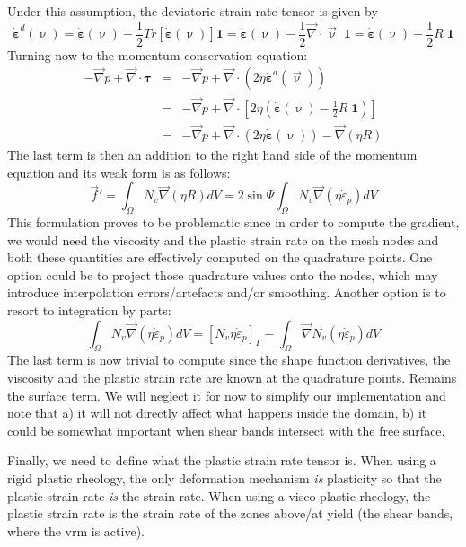 Under this assumption, the deviatoric strain rate tensor is given by
\[
\dot{\bm \varepsilon}^d(\upnu)
= \dot{\bm \varepsilon}(\upnu)- \frac{1}{2} Tr[\dot{\bm \varepsilon}(\upnu)] {\bm 1}
= \dot{\bm \varepsilon}(\upnu)- \frac{1}{2} \vec\nabla\cdot\vec\upnu \; {\bm 1}
= \dot{\bm \varepsilon}(\upnu)- \frac{1}{2} R \; {\bm 1}
\]
Turning now to the momentum conservation equation:
\begin{eqnarray}
-\vec\nabla p + \vec\nabla \cdot {\bm \tau} 
&=& -\vec\nabla p + \vec\nabla \cdot (2 \eta \dot{\bm \varepsilon}^d(\vec\upnu))  \\
&=& -\vec\nabla p + \vec\nabla \cdot \left[ 2 \eta \left(\dot{\bm \varepsilon}(\upnu)- \frac{1}{2} R \; {\bm 1}\right) \right] \\
&=& -\vec\nabla p 
+ \vec\nabla \cdot \left( 2 \eta \dot{\bm \varepsilon}(\upnu)\right) - \vec\nabla(\eta R) 
\end{eqnarray}
The last term is then an addition to the right hand side of the momentum equation 
and its weak form is as follows:
\[
\vec f' 
= \int_\Omega N_v \vec\nabla(\eta R) dV
= 2 \sin \Psi \int_\Omega N_v \vec\nabla(\eta \dot{\varepsilon}_p) dV
\]
This formulation proves to be problematic since in order to compute the gradient, we would
need the viscosity and the plastic strain rate on the mesh nodes and both these quantities
are effectively computed on the quadrature points. One option could be to project those quadrature
values onto the nodes, which may introduce interpolation errors/artefacts and/or smoothing. 
Another option is to resort to integration by parts:
\[
\int_\Omega N_v \vec\nabla(\eta \dot{\varepsilon}_p) dV
= \left[ N_v \eta \dot{\varepsilon}_p \right]_\Gamma 
-
\int_\Omega \vec\nabla N_v (\eta \dot{\varepsilon}_p) dV
\]
The last term is now trivial to compute since the shape function derivatives, the viscosity
and the plastic strain rate are known at the quadrature points. Remains the surface term. 
We will neglect it for now to simplify our implementation and note that a) it will not directly 
affect what happens inside the domain, b) it could be somewhat important when shear bands
intersect with the free surface. 

Finally, we need to define what the plastic strain rate tensor is. When using a rigid plastic 
rheology, the only deformation mechanism {\it is} plasticity so that the plastic strain rate {\it is}
the strain rate. When using a visco-plastic rheology, the plastic strain rate is the strain rate 
of the zones above/at yield (the shear bands, where the vrm is active).
 













